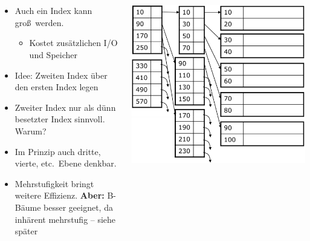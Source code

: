 \begin{frame}{\insertsection}
\framesubtitle{\insertsubsection}
\\[4pt]
\begin{columns}[T]
	\begin{column}{.5\textwidth}
		\begin{itemize}
			\item Auch ein Index kann gro\ss\ werden.
			\begin{itemize}
				\item Kostet zus\"atzlichen I/O und Speicher
			\end{itemize}
			\item Idee: Zweiten Index \"uber den ersten Index legen
			\item Zweiter Index nur als dünn besetzter Index sinnvoll. Warum?\\[10pt]
			\pause
			\item Im Prinzip auch dritte, vierte, etc.~Ebene denkbar. 
			\item Mehrstufigkeit bringt weitere Effizienz. \textbf{Aber:} B-B\"aume besser geeignet, 
			da inh\"arent mehrstufig -- siehe sp\"ater
		\end{itemize}
	\end{column}
	\onslide
	\begin{column}{.45\textwidth}
		\includegraphics[scale=0.25]{img/Index_Multilevel.png}
	\end{column}
\end{columns}
\end{frame}

